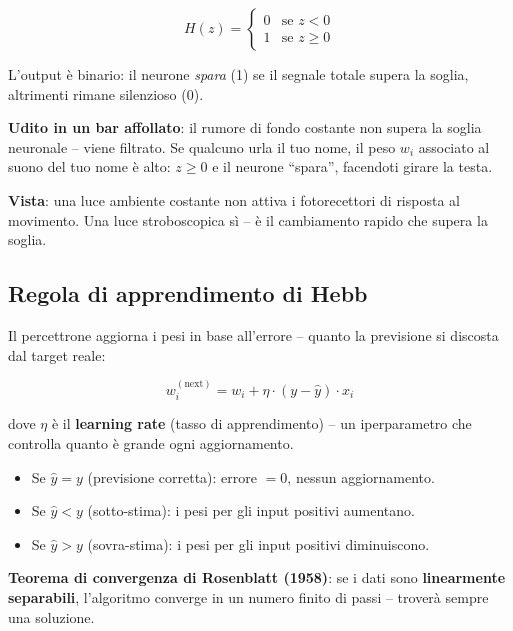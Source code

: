 \begin{equation}
H(z) =
\begin{cases}
0 & \text{se } z < 0 \\
1 & \text{se } z \geq 0
\end{cases}
\end{equation}

L'output è binario: il neurone \emph{spara} (1) se il segnale totale supera la soglia, altrimenti rimane silenzioso (0).

\begin{exbox}
\textbf{Udito in un bar affollato}: il rumore di fondo costante non supera la soglia neuronale -- viene filtrato. Se qualcuno urla il tuo nome, il peso $w_i$ associato al suono del tuo nome è alto: $z \geq 0$ e il neurone ``spara'', facendoti girare la testa.

\textbf{Vista}: una luce ambiente costante non attiva i fotorecettori di risposta al movimento. Una luce stroboscopica sì -- è il cambiamento rapido che supera la soglia.
\end{exbox}

\subsection{Regola di apprendimento di Hebb}

Il percettrone aggiorna i pesi in base all'errore -- quanto la previsione si discosta dal target reale:

\begin{equation}
\boxed{w_{i}^{(\text{next})} = w_{i} + \eta \cdot (y - \hat{y}) \cdot x_i}
\end{equation}

dove $\eta$ è il \textbf{learning rate} (tasso di apprendimento) -- un iperparametro che controlla quanto è grande ogni aggiornamento.

\begin{itemize}
    \item Se $\hat{y} = y$ (previsione corretta): errore $= 0$, nessun aggiornamento.
    \item Se $\hat{y} < y$ (sotto-stima): i pesi per gli input positivi aumentano.
    \item Se $\hat{y} > y$ (sovra-stima): i pesi per gli input positivi diminuiscono.
\end{itemize}

\textbf{Teorema di convergenza di Rosenblatt (1958)}: se i dati sono \textbf{linearmente separabili}, l'algoritmo converge in un numero finito di passi -- troverà sempre una soluzione.

